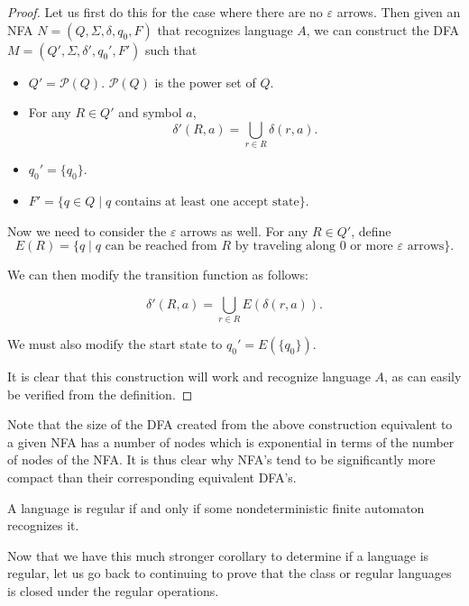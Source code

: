 \begin{proof}
Let us first do this for the case where there are no $\varepsilon$ arrows. Then given an NFA $N=(Q,\Sigma,\delta,q_0,F)$ that recognizes language $A$, we can construct the DFA $M=(Q',\Sigma,\delta',q_0',F')$ such that
\begin{itemize}
    \item $Q'=\mathcal{P}(Q)$. $\mathcal{P}(Q)$ is the power set of $Q$.
    \item For any $R\in Q'$ and symbol $a$, $$\delta'(R,a)=\bigcup_{r\in R}\delta(r,a).$$
    \item $q_0'=\{q_0\}$.
    \item $F'=\{q\in Q\mid q\text{ contains at least one accept state}\}$.
\end{itemize}
Now we need to consider the $\varepsilon$ arrows as well. For any $R\in Q'$, define $$E(R)=\{q\mid q \text{ can be reached from $R$ by traveling along $0$ or more $\varepsilon$ arrows}\}.$$

We can then modify the transition function as follows:

$$\delta'(R,a)=\bigcup_{r\in R} E(\delta(r,a)).$$

We must also modify the start state to $q_0'=E(\{q_0\})$.

It is clear that this construction will work and recognize language $A$, as can easily be verified from the definition.
\end{proof}

Note that the size of the DFA created from the above construction equivalent to a given NFA has a number of nodes which is exponential in terms of the number of nodes of the NFA. It is thus clear why NFA's tend to be significantly more compact than their corresponding equivalent DFA's.

\begin{corollary}
A language is regular if and only if some nondeterministic finite automaton recognizes it.
\end{corollary}

Now that we have this much stronger corollary to determine if a language is regular, let us go back to continuing to prove that the class or regular languages is closed under the regular operations.

